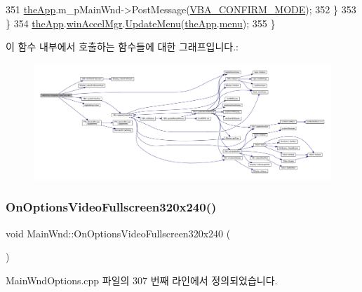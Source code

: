 \begin{DoxyCode}
351       \mbox{\hyperlink{_v_b_a_8cpp_a8095a9d06b37a7efe3723f3218ad8fb3}{theApp}}.m\_pMainWnd->PostMessage(\mbox{\hyperlink{_main_wnd_options_8cpp_a583b057d2cc74711df7dc28e1b185339}{VBA\_CONFIRM\_MODE}});
352     \}
353   \}
354   \mbox{\hyperlink{_v_b_a_8cpp_a8095a9d06b37a7efe3723f3218ad8fb3}{theApp}}.\mbox{\hyperlink{class_v_b_a_ad7ebce057dbde0ca88cee75e84721a89}{winAccelMgr}}.\mbox{\hyperlink{class_c_accelerator_manager_ac7411d20f413ea0ec3bd65705b564adf}{UpdateMenu}}(\mbox{\hyperlink{_v_b_a_8cpp_a8095a9d06b37a7efe3723f3218ad8fb3}{theApp}}.\mbox{\hyperlink{class_v_b_a_acf9d855b5b959a2df9c6cb21b888366e}{menu}});
355 \}
\end{DoxyCode}
이 함수 내부에서 호출하는 함수들에 대한 그래프입니다.\+:
\nopagebreak
\begin{figure}[H]
\begin{center}
\leavevmode
\includegraphics[width=350pt]{class_main_wnd_af40af1ba864ff1718ef3fe96279656d2_cgraph}
\end{center}
\end{figure}
\mbox{\label{class_main_wnd_a6cdf116ca046f531f38d3d4ecb506f93}} 
\subsubsection{\texorpdfstring{On\+Options\+Video\+Fullscreen320x240()}{OnOptionsVideoFullscreen320x240()}}
{\footnotesize\ttfamily void Main\+Wnd\+::\+On\+Options\+Video\+Fullscreen320x240 (\begin{DoxyParamCaption}{ }\end{DoxyParamCaption})\hspace{0.3cm}{\ttfamily [protected]}}



Main\+Wnd\+Options.\+cpp 파일의 307 번째 라인에서 정의되었습니다.


